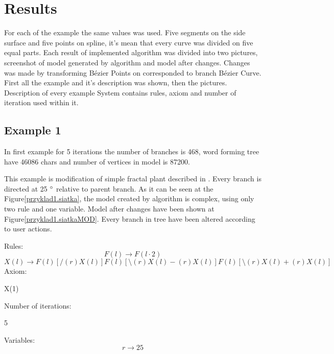 \documentclass[b5paper,twoside,11pt]{article}
\renewcommand{\figurename}{Figure}
\begin{document}
\section{Results}
For each of the example the same values was used. Five segments on the side surface and five points on spline, it's mean that every curve was divided on five equal parts. Each result of implemented algorithm was divided into two pictures, screenshot of model generated by algorithm and model after changes. Changes was made by transforming Bézier Points on corresponded to branch Bézier Curve. First all the example and it's description was shown, then the pictures. Description of every example System contains rules, axiom and number of iteration used within it.
\subsection*{Example 1}
In first example for 5 iterations the number of branches is 468, word forming tree have 46086 chars and number of vertices in model is 87200.\par
This example is modification of simple fractal plant described in \cite{prusinABOP}.
Every branch is directed at 25  $\degree$ relative to parent branch. As it can be seen at the \figurename \ref{przyklad1.siatka}, the model created by algorithm is complex, using only two rule and one variable. Model after changes have been shown at  \figurename \ref{przyklad1.siatkaMOD}. Every branch in tree have been altered according to user actions.\par 
Rules: \newline
\begin{equation}
F(l)\rightarrow F(l\cdot2) 
\end{equation}
\begin{equation}
X(l) \rightarrow F(l)[/(r)X(l)]F(l)[\setminus(r)X(l)-(r)X(l)]F(l)[\setminus(r)X(l)+(r)X(l)] 
\end{equation}
Axiom:
\begin{center}
X(1)
\end{center}
Number of iterations:
\begin{center}
5
\end{center}
Variables:
\begin{equation}
r\rightarrow 25
\end{equation}
\end{document}
